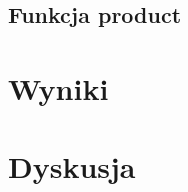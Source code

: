 \documentclass[10pt, a4paper]{article}
\begin{document}
\begin{sloppypar}
    \subsection{Funkcja product}


    \section{Wyniki}


    \section{Dyskusja}
  \end{sloppypar}
  \newpage
  \begin{sloppypar}
    \medskip


    \printbibliography
    [heading=bibintoc, title={Odwołania}]
  \end{sloppypar}
\end{document}
